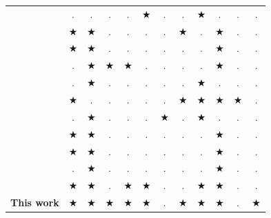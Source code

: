 \documentclass[preprint,authoryear]{elsarticle}
\begin{document}
\begin{table}[H]
\begin{tabular}{r|ccc|cc|cc|ccc|c}
		\cite{kaspi2019}            & $.$        & $.$         & $.$       & $.$      &$\bigstar$& $.$      & $.$      &$\bigstar$ & $.$        &  $.$       &  $.$ \\
		
		\cite{RoesenerHall2014}     & $\bigstar$ & $\bigstar$  & $.$       & $.$      & $.$      & $.$      &$\bigstar$& $.$       & $\bigstar$ &  $.$       &  $.$ \\
		\cite{Vancroonemburg2014}   & $\bigstar$ & $\bigstar$  & $.$       & $.$      & $.$      & $.$      & $.$      & $.$       & $\bigstar$ &  $.$       &  $.$ \\
		\cite{LurkinSchyns2015}     & $.$        & $\bigstar$  & $\bigstar$&$\bigstar$& $.$      & $.$      & $.$      & $.$       & $\bigstar$ &  $.$       &  $.$ \\
		\cite{RoesenerBarnes2016}   & $.$        & $\bigstar$  & $.$       & $.$      & $.$      & $.$      & $.$      & $\bigstar$& $.$        &  $.$       &  $.$ \\
		
		\cite{PaquaySchynsLimbourg2016,PaquayLimbourgSchynsOliveira2018}&$\bigstar$&$.$&$.$&$.$&$.$&$.$     &$\bigstar$&$\bigstar$ & $\bigstar$&$\bigstar$  &  $.$ \\
		
		\cite{YangLiuGao2018}       & $.$        & $\bigstar$  & $.$       & $.$      & $.$      &$\bigstar$& $.$      & $\bigstar$ & $.$       & $.$        &  $.$ \\
		\cite{wong2020}             & $\bigstar$ & $\bigstar$  & $.$       & $.$      & $.$      & $.$      & $.$      & $.$        & $\bigstar$& $.$        &  $.$  \\
		\cite{eugene2021}           & $\bigstar$ & $\bigstar$  & $.$       & $.$      & $.$      & $.$      & $.$      & $.$        & $\bigstar$& $.$        &  $.$  \\
		\cite{zhao2021}             & $.$        & $\bigstar$  & $.$       & $.$      & $.$      & $.$      & $.$      & $.$        & $\bigstar$&  $.$       &  $.$ \\
		
		\cite{MesquitaSanches2023}  & $\bigstar$ & $\bigstar$  & $.$       &$\bigstar$&$\bigstar$& $.$      & $.$      & $\bigstar$ & $\bigstar$&  $.$       &  $.$  \\
		
		{\bf This work}             & $\bigstar$ & $\bigstar$  &$\bigstar$ &$\bigstar$&$\bigstar$& $.$      & $\bigstar$      & $\bigstar$ & $\bigstar$&  $.$       &  $\bigstar$  \\
		\bottomrule 
	\end{tabular}
	\normalsize 
\end{table}
\end{document}
